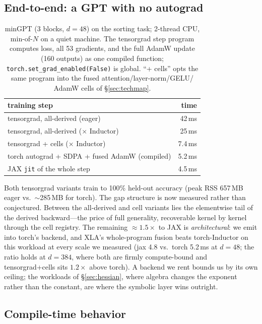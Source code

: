 \documentclass[sigplan,10pt,review]{acmart}
\begin{document}
\subsection{End-to-end: a GPT with no autograd}\label{sec:e2e}

\begin{table}
\caption{minGPT \cite{mingpt} (3 blocks, $d{=}48$) on the sorting task; 2-thread CPU,
min-of-$N$ on a quiet machine. The tensorgrad step program computes loss,
all 53 gradients, and the full AdamW update (160 outputs) as one compiled
function; \texttt{torch.set\_grad\_enabled(False)} is global. ``+
cells'' opts the same program into the fused attention/layer-norm/GELU/
AdamW cells of \S\ref{sec:techmap}.}
\label{tab:e2e}
\small
\begin{tabular}{lr}
\toprule
training step & time \\
\midrule
tensorgrad, all-derived (eager) & 42\,ms \\
tensorgrad, all-derived ($\times$ Inductor) & 25\,ms \\
tensorgrad + cells ($\times$ Inductor) & 7.4\,ms \\
torch autograd + SDPA + fused AdamW (compiled) & 5.2\,ms \\
JAX \texttt{jit} of the whole step & 4.5\,ms \\
\bottomrule
\end{tabular}
\end{table}

Both tensorgrad variants train to 100\% held-out accuracy (peak RSS
657\,MB eager vs.\ $\sim$285\,MB for torch). The gap structure is now
measured rather than conjectured. Between the all-derived and cell
variants lies the elementwise tail of the derived backward---the price
of full generality, recoverable kernel by kernel through the cell
registry. The remaining ${\approx}1.5\times$ to JAX is \emph{architectural}: we
emit into torch's backend, and XLA's whole-program fusion beats
torch-Inductor on this workload at every scale we measured (jax 4.8 vs.\
torch 5.2\,ms at $d{=}48$; the ratio holds at $d{=}384$, where both
are firmly compute-bound and tensorgrad+cells sits $1.2\times$ above
torch). A backend we rent bounds us by its own ceiling; the workloads of
\S\ref{sec:hessian}, where algebra changes the exponent rather than the
constant, are where the symbolic layer wins outright.

\subsection{Compile-time behavior}
\end{document}
